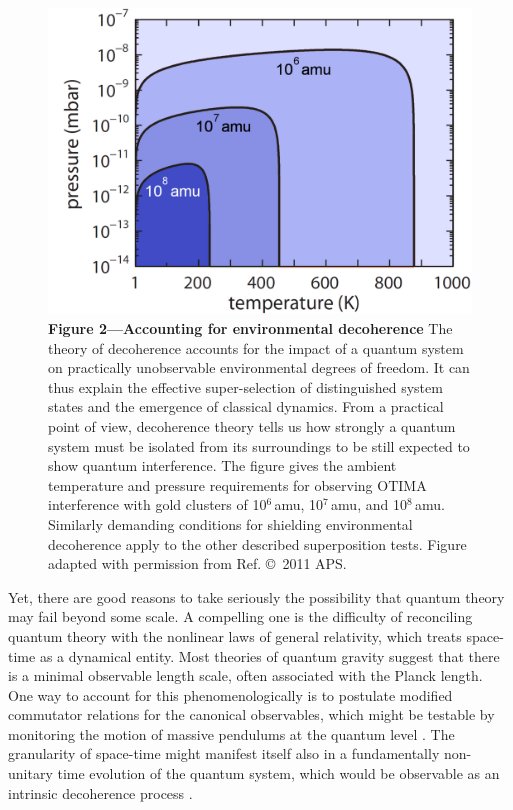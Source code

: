 \documentclass[11pt]{article}
\begin{document}
\begin{figure}
\includegraphics[width=0.8\columnwidth]{Fig2.pdf}
\\
\small
{\bfseries\sffamily Figure 2---Accounting for environmental decoherence}
The theory of decoherence accounts for the impact of a quantum system on practically unobservable environmental degrees of freedom\cite{Joos2003,Zurek2003}. It can thus explain the effective super-selection of distinguished system states and the emergence of classical dynamics. From a practical point of view, decoherence theory  tells us how strongly a quantum system must be isolated from its surroundings to be still  expected to show quantum interference. The figure gives the ambient temperature and pressure requirements for observing OTIMA interference with gold clusters of 10$^6$\,amu, 10$^7$\,amu, and 10$^8$\,amu. Similarly demanding conditions for shielding environmental decoherence apply to the other described superposition tests. Figure adapted with permission from Ref.  \copyright\ 2011 APS.
\end{figure} 

Yet, there are good reasons to take seriously the possibility that
quantum theory may fail beyond some scale. A compelling one is the difficulty of reconciling quantum theory with the nonlinear laws of general relativity, which treats space-time as a dynamical entity. Most theories of quantum gravity
suggest that there is a minimal observable length scale, often associated with the Planck length. One way to account for this phenomenologically is to postulate modified commutator relations for the canonical observables,
which might be testable by monitoring the motion of massive pendulums at the quantum level \cite{Abbott2009,PhysRevLett.101.221301, PhysRevD.86.085017, pikovski2012probing, marin2012gravitational}.
The granularity of space-time might  manifest itself also
in a fundamentally non-unitary time evolution of the quantum system, which would be  observable as an intrinsic decoherence process \cite{Percival1997,PhysRevLett.93.240401,Milburn-intrinsic2006,Wang2006a}.
\end{document}
